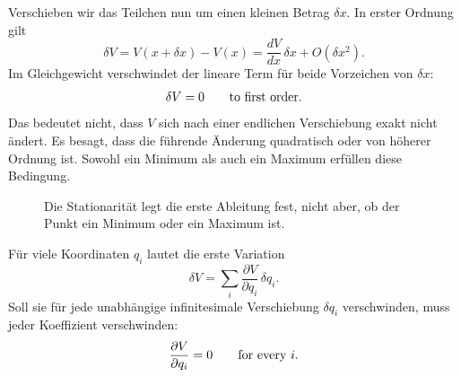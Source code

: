 Verschieben wir das Teilchen nun um einen kleinen Betrag \(\delta x\). In erster Ordnung gilt
\begin{equation}
  \delta V
  =V(x+\delta x)-V(x)
  =\frac{dV}{dx}\,\delta x+O(\delta x^2).
  \label{eq:first-variation-one}
\end{equation}
Im Gleichgewicht verschwindet der lineare Term für beide Vorzeichen von \(\delta x\):
\begin{equation}
  \delta V=0
  \qquad\hbox{to first order.}
  \label{eq:delta-v-zero-one}
\end{equation}
Das bedeutet nicht, dass \(V\) sich nach einer endlichen Verschiebung exakt nicht ändert. Es besagt, dass die führende Änderung quadratisch oder von höherer Ordnung ist. Sowohl ein Minimum als auch ein Maximum erfüllen diese Bedingung.

\begin{figure}[htbp]
  \centering
  \caption{Die Stationarität legt die erste Ableitung fest, nicht aber, ob der Punkt ein Minimum oder ein Maximum ist.}
  \label{fig:min-max-stationary}
\end{figure}

Für viele Koordinaten \(q_i\) lautet die erste Variation
\begin{equation}
  \delta V
  =\sum_i\frac{\partial V}{\partial q_i}\,\delta q_i.
  \label{eq:first-variation-many}
\end{equation}
Soll sie für jede unabhängige infinitesimale Verschiebung \(\delta q_i\) verschwinden, muss jeder Koeffizient verschwinden:
\begin{equation}
  \frac{\partial V}{\partial q_i}=0
  \qquad\hbox{for every }i.
  \label{eq:stationary-v-many}
\end{equation}

